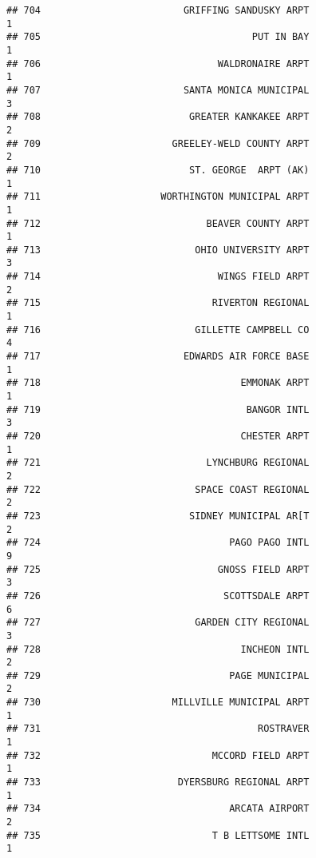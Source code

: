 \documentclass[
]{article}
\begin{document}
\begin{verbatim}
## 704                         GRIFFING SANDUSKY ARPT                           1
## 705                                     PUT IN BAY                           1
## 706                               WALDRONAIRE ARPT                           1
## 707                         SANTA MONICA MUNICIPAL                           3
## 708                          GREATER KANKAKEE ARPT                           2
## 709                       GREELEY-WELD COUNTY ARPT                           2
## 710                          ST. GEORGE  ARPT (AK)                           1
## 711                     WORTHINGTON MUNICIPAL ARPT                           1
## 712                             BEAVER COUNTY ARPT                           1
## 713                           OHIO UNIVERSITY ARPT                           3
## 714                               WINGS FIELD ARPT                           2
## 715                              RIVERTON REGIONAL                           1
## 716                           GILLETTE CAMPBELL CO                           4
## 717                         EDWARDS AIR FORCE BASE                           1
## 718                                   EMMONAK ARPT                           1
## 719                                    BANGOR INTL                           3
## 720                                   CHESTER ARPT                           1
## 721                             LYNCHBURG REGIONAL                           2
## 722                           SPACE COAST REGIONAL                           2
## 723                          SIDNEY MUNICIPAL AR[T                           2
## 724                                 PAGO PAGO INTL                           9
## 725                               GNOSS FIELD ARPT                           3
## 726                                SCOTTSDALE ARPT                           6
## 727                           GARDEN CITY REGIONAL                           3
## 728                                   INCHEON INTL                           2
## 729                                 PAGE MUNICIPAL                           2
## 730                       MILLVILLE MUNICIPAL ARPT                           1
## 731                                      ROSTRAVER                           1
## 732                              MCCORD FIELD ARPT                           1
## 733                        DYERSBURG REGIONAL ARPT                           1
## 734                                 ARCATA AIRPORT                           2
## 735                              T B LETTSOME INTL                           1

\end{verbatim}
\end{document}
